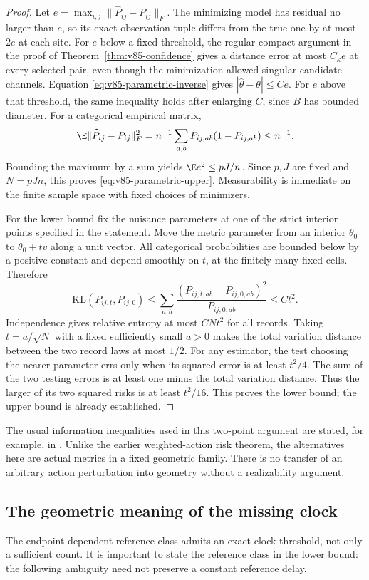 \begin{proof}
Let $e=\max_{i,j}\|\widehat P_{ij}-P_{ij}\|_F$. The minimizing
model has residual no larger than $e$, so its exact observation tuple
differs from the true one by at most $2e$ at each site. For $e$ below
a fixed threshold, the regular-compact argument in the proof of
Theorem~\ref{thm:v85-confidence} gives a distance error at most
$C_\kappa e$ at every selected pair, even though the minimization
allowed singular candidate channels. Equation
\eqref{eq:v85-parametric-inverse} gives
$|\widehat\theta-\theta|\le C e$.
For $e$ above that threshold, the same inequality holds after enlarging
$C$, since $B$ has bounded diameter. For a categorical empirical matrix,
\[
 \E\|\widehat P_{ij}-P_{ij}\|_F^2
       =n^{-1}\sum_{a,b}P_{ij,ab}(1-P_{ij,ab})\le n^{-1}.
\]
Bounding the maximum by a sum yields $\E e^2\le pJ/n$. Since $p,J$
are fixed and $N=pJn$, this proves \eqref{eq:v85-parametric-upper}.
Measurability is immediate on the finite sample space with fixed
choices of minimizers.

For the lower bound fix the nuisance parameters at one of the strict
interior points specified in the statement. Move the metric parameter
from an interior $\theta_0$ to $\theta_0+t v$ along a unit vector.
All categorical probabilities are bounded below by a positive constant
and depend smoothly on $t$, at the finitely many fixed cells. Therefore
\[
  \mathrm{KL}(P_{ij,t},P_{ij,0})
       \le\sum_{a,b}\frac{(P_{ij,t,ab}-P_{ij,0,ab})^2}{P_{ij,0,ab}}
       \le C t^2.
\]
Independence gives relative entropy at most $CNt^2$ for all records.
Taking $t=a/\sqrt N$ with a fixed sufficiently small $a>0$ makes
the total variation distance between the two record laws at most
$1/2$. For any estimator, the test choosing the nearer parameter errs
only when its squared error is at least $t^2/4$. The sum of the two
testing errors is at least one minus the total variation distance.
Thus the larger of its two squared risks is at least $t^2/16$.
This proves the lower bound; the upper bound is already established.
\end{proof}
The usual information inequalities used in this two-point argument
are stated, for example, in \cite{V85Tsybakov}. Unlike the earlier
weighted-action risk theorem, the alternatives here are actual
metrics in a fixed geometric family. There is no transfer of an
arbitrary action perturbation into geometry without a realizability
argument.

\subsection{The geometric meaning of the missing clock}
The endpoint-dependent reference class admits an exact clock threshold,
not only a sufficient count. It is important to state the reference
class in the lower bound: the following ambiguity need not preserve a
constant reference delay.

